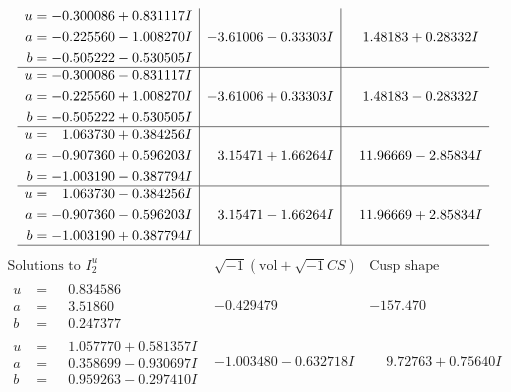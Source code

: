 \documentclass[1p]{elsarticle_modified}
\theoremstyle{definition}
\newcommand{\I}{\sqrt{-1}}
\begin{document}
$$\begin{array}{c|c|c}
\begin{aligned}
u &= -0.300086 + 0.831117 I \\
a &= -0.225560 - 1.008270 I \\
b &= -0.505222 - 0.530505 I\end{aligned}
 & -3.61006 - 0.33303 I & \phantom{-}1.48183 + 0.28332 I \\ \hline\begin{aligned}
u &= -0.300086 - 0.831117 I \\
a &= -0.225560 + 1.008270 I \\
b &= -0.505222 + 0.530505 I\end{aligned}
 & -3.61006 + 0.33303 I & \phantom{-}1.48183 - 0.28332 I \\ \hline\begin{aligned}
u &= \phantom{-}1.063730 + 0.384256 I \\
a &= -0.907360 + 0.596203 I \\
b &= -1.003190 - 0.387794 I\end{aligned}
 & \phantom{-}3.15471 + 1.66264 I & \phantom{-}11.96669 - 2.85834 I \\ \hline\begin{aligned}
u &= \phantom{-}1.063730 - 0.384256 I \\
a &= -0.907360 - 0.596203 I \\
b &= -1.003190 + 0.387794 I\end{aligned}
 & \phantom{-}3.15471 - 1.66264 I & \phantom{-}11.96669 + 2.85834 I\\
 \hline 
 \end{array}$$\newpage$$\begin{array}{c|c|c}  
\text{Solutions to }I^u_{2}& \I (\text{vol} + \sqrt{-1}CS) & \text{Cusp shape}\\
 \hline 
\begin{aligned}
u &= \phantom{-}0.834586\phantom{ +0.000000I} \\
a &= \phantom{-}3.51860\phantom{ +0.000000I} \\
b &= \phantom{-}0.247377\phantom{ +0.000000I}\end{aligned}
 & -0.429479\phantom{ +0.000000I} & -157.470\phantom{ +0.000000I} \\ \hline\begin{aligned}
u &= \phantom{-}1.057770 + 0.581357 I \\
a &= \phantom{-}0.358699 - 0.930697 I \\
b &= \phantom{-}0.959263 - 0.297410 I\end{aligned}
 & -1.003480 - 0.632718 I & \phantom{-}9.72763 + 0.75640 I \\ \hline\begin{aligned}

\end{aligned}
\end{array}$$
\end{document}
